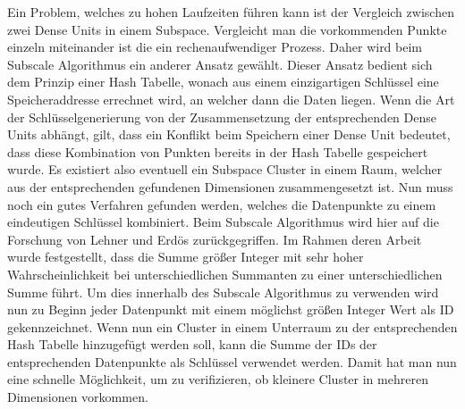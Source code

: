 \documentclass[utf8,biblatex]{lni}
\begin{document}
Ein Problem, welches zu hohen Laufzeiten führen kann ist der Vergleich zwischen zwei Dense Units in einem Subspace. 
Vergleicht man die vorkommenden Punkte einzeln miteinander ist die ein rechenaufwendiger Prozess. 
Daher wird beim Subscale Algorithmus ein anderer Ansatz gewählt. 
Dieser Ansatz bedient sich dem Prinzip einer Hash Tabelle, wonach aus einem einzigartigen Schlüssel eine Speicheraddresse errechnet wird, an welcher dann die Daten liegen. 
Wenn die Art der Schlüsselgenerierung von der Zusammensetzung der entsprechenden Dense Units abhängt, gilt, dass ein Konflikt beim Speichern einer Dense Unit bedeutet, dass diese Kombination von Punkten bereits in der Hash Tabelle gespeichert wurde. 
Es existiert also eventuell ein Subspace Cluster in einem Raum, welcher aus der entsprechenden gefundenen Dimensionen zusammengesetzt ist. 
Nun muss noch ein gutes Verfahren gefunden werden, welches die Datenpunkte zu einem eindeutigen Schlüssel kombiniert. 
Beim Subscale Algorithmus wird hier auf die Forschung von Lehner und Erdös zurückgegriffen. 
Im Rahmen deren Arbeit wurde festgestellt, dass die Summe größer Integer mit sehr hoher Wahrscheinlichkeit bei unterschiedlichen Summanten zu einer unterschiedlichen Summe führt. 
Um dies innerhalb des Subscale Algorithmus zu verwenden wird nun zu Beginn jeder Datenpunkt mit einem möglichst größen Integer Wert als ID gekennzeichnet. 
Wenn nun ein Cluster in einem Unterraum zu der entsprechenden Hash Tabelle hinzugefügt werden soll, kann die Summe der IDs der entsprechenden Datenpunkte als Schlüssel verwendet werden. 
Damit hat man nun eine schnelle Möglichkeit, um zu verifizieren, ob kleinere Cluster in mehreren Dimensionen vorkommen. 
\end{document}

